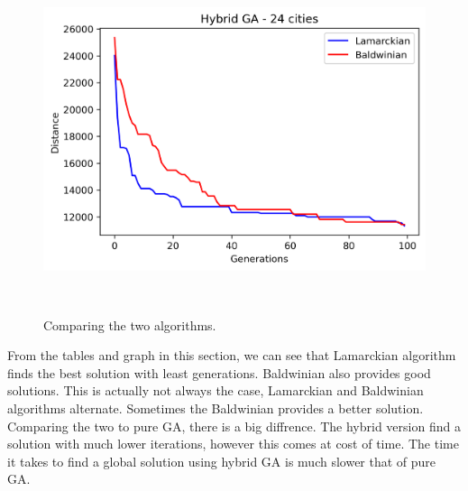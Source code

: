 \documentclass[a4paper,12pt]{article}
\begin{document}
\begin{figure}[H]
\centerline{\includegraphics[width=6in, height=4in]{hybridGen20.png}}
\caption{Comparing the two algorithms.}
\label{fig}
\end{figure}

From the tables and graph in this section, we can see that Lamarckian algorithm finds the best solution with least generations. Baldwinian also provides good solutions. This is actually not always the case, Lamarckian and Baldwinian algorithms alternate. Sometimes the Baldwinian provides a better solution. Comparing the two to pure GA, there is a big diffrence. The hybrid version find a solution with much lower iterations, however this comes at cost of time. The time it takes to find a global solution using hybrid GA is much slower that of pure GA. 
\end{document}
